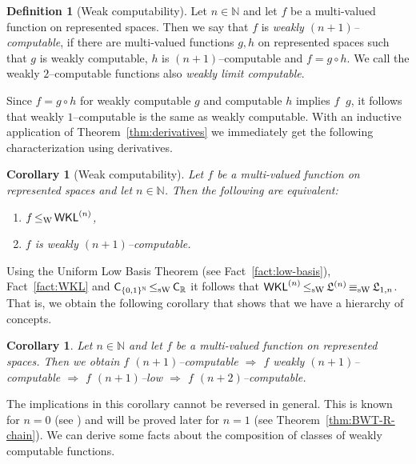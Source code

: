 \documentclass[a4paper]{amsart}
\def\IN{{\mathbb{N}}}
\def\IR{{\mathbb{R}}}
\def\Low{\mathfrak{L}}
\def\TO{\Longrightarrow}
\def\Cantor{{\{0,1\}^\IN}}
\def\WKL{\text{\rm\sffamily WKL}}
\def\C{\mbox{\rm\sffamily C}}
\def\leqW{\mathop{\leq_{\mathrm{W}}}}
\def\leqSW{\mathop{\leq_{\mathrm{sW}}}}
\def\equivSW{\mathop{\equiv_{\mathrm{sW}}}}
\newtheorem{corollary}[theorem]{Corollary}
\theoremstyle{definition}
\newtheorem{definition}[theorem]{Definition}
\begin{document}
\begin{definition}[Weak computability]
Let $n\in\IN$ and let $f$ be a multi-valued function on represented spaces. Then we 
say that $f$ is {\em weakly $(n+1)$--computable}, if there are multi-valued functions $g,h$
on represented spaces such that $g$ is weakly computable, $h$ is $(n+1)$--computable and $f=g\circ h$.
We call the weakly $2$--computable functions also {\em weakly limit computable}.
\end{definition}

Since $f=g\circ h$ for weakly computable $g$ and computable $h$ implies $f\leqW g$,
it follows that weakly $1$--computable is the same as weakly computable.
With an inductive application of  Theorem~\ref{thm:derivatives} we immediately get the following characterization
using derivatives.

\begin{corollary}[Weak computability]
\label{cor:weak}
Let $f$ be a multi-valued function on represented spaces and let $n\in\IN$. 
Then the following are equivalent:
\begin{enumerate}
\item $f\leqW\WKL^{(n)}$,
\item $f$ is weakly $(n+1)$--computable.
\end{enumerate}
\end{corollary}

Using the Uniform Low Basis Theorem (see Fact~\ref{fact:low-basis}), Fact~\ref{fact:WKL}
and $\C_\Cantor\leqSW\C_\IR$ it follows that $\WKL^{(n)}\leqSW\Low^{(n)}\equivSW\Low_{1,n}$. 
That is, we obtain the following corollary that shows that we 
have a hierarchy of concepts.

\begin{corollary}
\label{cor:weak-low}
Let $n\in\IN$ and let $f$ be a multi-valued function on represented spaces.
Then we obtain $f$ $(n+1)$--computable $\TO$ $f$ weakly $(n+1)$--computable $\TO$ $f$ $(n+1)$--low
$\TO$ $f$ $(n+2)$--computable.
\end{corollary}

The implications in this corollary cannot be reversed in general. This is known for $n=0$ (see \cite{BBP})
and will be proved later for $n=1$ (see Theorem~\ref{thm:BWT-R-chain}). 
We can derive some facts about the composition of classes of weakly computable functions.
\end{document}

